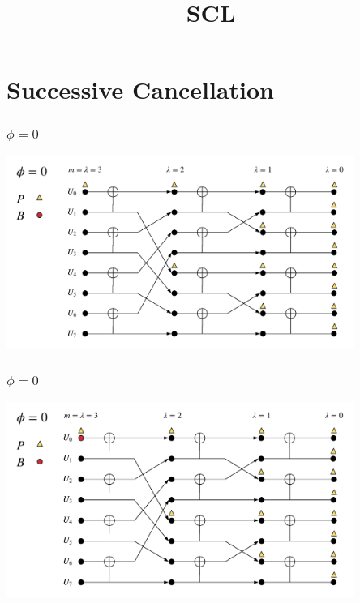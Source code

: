 \documentclass{beamer}
\title{SCL}
\begin{document}
\begin{frame}
\titlepage
\end{frame}

\begin{frame}
	\tableofcontents
\end{frame}


\section{Successive Cancellation}

\begin{frame}
\frametitle{$\phi=0$}
  \begin{center}
  \includegraphics[width=0.85\textwidth]{scl_pics/CalcP_0.png}
  \end{center}
\end{frame}

\begin{frame}
\frametitle{$\phi=0$}
  \begin{center}
  \includegraphics[width=0.85\textwidth]{scl_pics/UpdateB_0.png}
  \end{center}
\end{frame}
\end{document}
